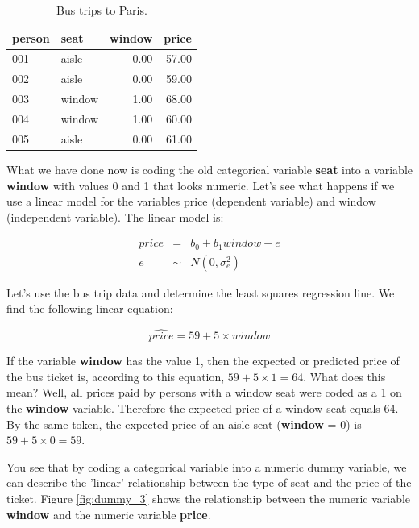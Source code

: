 \documentclass[]{book}\usepackage[]{graphicx}\usepackage[]{color}
\begin{document}
\begin{table}[ht]
\centering
\caption{Bus trips to Paris.} 
\label{tab:dummy_2}
\begin{tabular}{llrr}
  \hline
person & seat & window & price \\ 
  \hline
001 & aisle & 0.00 & 57.00 \\ 
  002 & aisle & 0.00 & 59.00 \\ 
  003 & window & 1.00 & 68.00 \\ 
  004 & window & 1.00 & 60.00 \\ 
  005 & aisle & 0.00 & 61.00 \\ 
   \hline
\end{tabular}
\end{table}


What we have done now is coding the old categorical variable \textbf{seat} into a variable \textbf{window} with values 0 and 1 that looks numeric. Let's see what happens if we use a linear model for the variables price (dependent variable) and window (independent variable). The linear model is:

\begin{eqnarray}
price &=& b_0 + b_1 window + e \\
e &\sim& N(0,\sigma^2_e)
\end{eqnarray}

Let's use the bus trip data and determine the least squares regression line. We find the following linear equation:


\begin{equation}
\widehat{price} = 59 + 5 \times window
\end{equation}

If the variable \textbf{window} has the value 1, then the expected or predicted price of the bus ticket is, according to this equation, $59 + 5\times  1= 64$. What does this mean? Well, all prices paid by persons with a window seat were coded as a 1 on the \textbf{window} variable. Therefore the expected price of a window seat equals 64. By the same token, the expected price of an aisle seat (\textbf{window} = 0) is $59 + 5\times 0= 59$.

You see that by coding a categorical variable into a numeric dummy variable, we can describe the 'linear' relationship between the type of seat and the price of the ticket. Figure \ref{fig:dummy_3} shows the relationship between the numeric variable \textbf{window} and the numeric variable \textbf{price}. 
\end{document}
